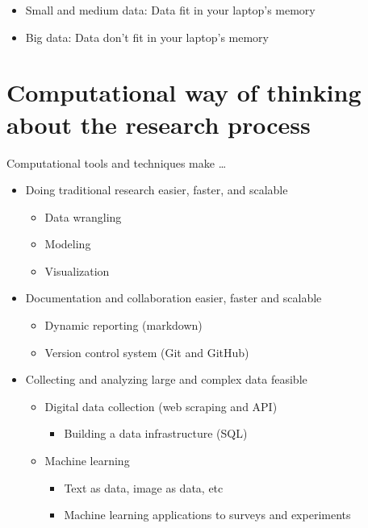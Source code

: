 \documentclass[
]{book}
\providecommand{\tightlist}{%
  \setlength{\itemsep}{0pt}\setlength{\parskip}{0pt}}
\begin{document}
\begin{itemize}
\tightlist
\item
  Small and medium data: Data fit in your laptop's memory
\item
  Big data: Data don't fit in your laptop's memory
\end{itemize}

\hypertarget{computational-way-of-thinking-about-the-research-process}{%
\section{Computational way of thinking about the research process}\label{computational-way-of-thinking-about-the-research-process}}

Computational tools and techniques make \ldots{}

\begin{itemize}
\item
  Doing traditional research easier, faster, and scalable

  \begin{itemize}
  \tightlist
  \item
    Data wrangling
  \item
    Modeling
  \item
    Visualization
  \end{itemize}
\item
  Documentation and collaboration easier, faster and scalable

  \begin{itemize}
  \tightlist
  \item
    Dynamic reporting (markdown)
  \item
    Version control system (Git and GitHub)
  \end{itemize}
\item
  Collecting and analyzing large and complex data feasible

  \begin{itemize}
  \item
    Digital data collection (web scraping and API)

    \begin{itemize}
    \tightlist
    \item
      Building a data infrastructure (SQL)
    \end{itemize}
  \item
    Machine learning

    \begin{itemize}
    \tightlist
    \item
      Text as data, image as data, etc
    \item
      Machine learning applications to surveys and experiments
    \end{itemize}
  \end{itemize}
\end{itemize}
\end{document}
